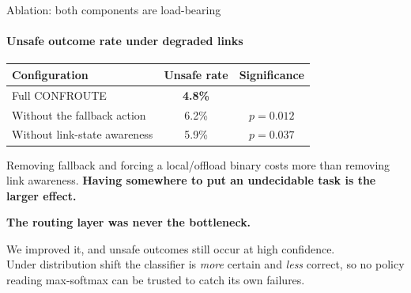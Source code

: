\documentclass[aspectratio=169, 11pt]{beamer}
\newcommand{\shout}[1]{{\color{navy}\bfseries #1}}
\newcommand{\statement}[2]{%
{\setbeamertemplate{footline}{}
\begin{frame}[plain]
  \vfill
  \begin{center}
    {\color{navy}\Large\bfseries #1}\\[0.8em]
    \begin{minipage}{0.78\textwidth}\centering\color{ink2}\normalsize #2\end{minipage}
  \end{center}
  \vfill
\end{frame}}}
\begin{document}
\begin{frame}{Ablation: both components are load-bearing}
\framesubtitle{Unsafe outcome rate under degraded links}

\vspace{1.2em}
\centering
{\large
\begin{tabular}{@{}lcc@{}}
\toprule
\textbf{\color{navy}Configuration} & \textbf{\color{navy}Unsafe rate} & \textbf{\color{navy}Significance} \\
\midrule
Full CONFROUTE               & \textbf{\color{cblue}4.8\%} & \\[0.35em]
Without the fallback action  & 6.2\% & $p = 0.012$ \\[0.35em]
Without link-state awareness & 5.9\% & $p = 0.037$ \\
\bottomrule
\end{tabular}}

\vspace{1.6em}
\begin{minipage}{0.82\textwidth}
{\small Removing fallback and forcing a local/offload binary costs more than removing link awareness. \shout{Having somewhere to put an undecidable task is the larger effect.}}
\end{minipage}
\end{frame}

\statement{The routing layer was never the bottleneck.}{%
We improved it, and unsafe outcomes still occur at high confidence.\\[0.6em]
Under distribution shift the classifier is \emph{more} certain and \emph{less} correct, so no policy reading max-softmax can be trusted to catch its own failures.}
\end{document}
